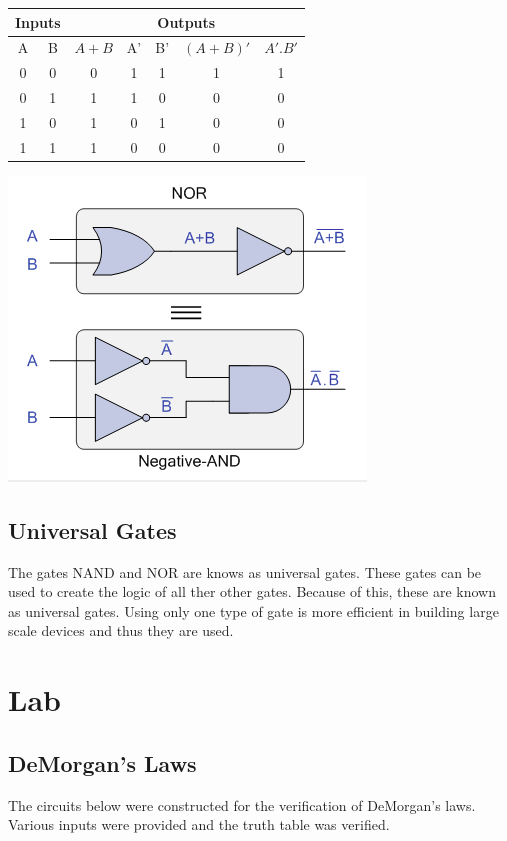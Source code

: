 \documentclass[a4paper, 12pt]{article}
\begin{document}
\begin{center}
  \begin{tabular}{|c|c|c|c|c|c|c|}
    \hline
    \multicolumn{2}{|c|}{Inputs}& \multicolumn{5}{|c|}{Outputs}  \\
    \hline
    A & B & $A+B$ & A' & B' & $(A+B)'$ & $A' . B'$ \\
    \hline
    0 & 0 & 0 & 1 & 1 & 1 & 1\\
    0 & 1 & 1 & 1 & 0 & 0 & 0\\
    1 & 0 & 1 & 0 & 1 & 0 & 0\\
    1 & 1 & 1 & 0 & 0 & 0 & 0\\
    \hline
  \end{tabular}
  \includegraphics{demorgan-second}

\end{center}
\subsection{Universal Gates}
The gates NAND and NOR are knows as universal gates. These gates can be used to create the logic of all ther other gates. Because of this, these are known as universal gates. Using only one type of gate is more efficient in building large scale devices and thus they are used.

\section{Lab}
\subsection{DeMorgan's Laws}
The circuits below were constructed for the verification of DeMorgan's laws. Various inputs were provided and the truth table was verified.
\end{document}
